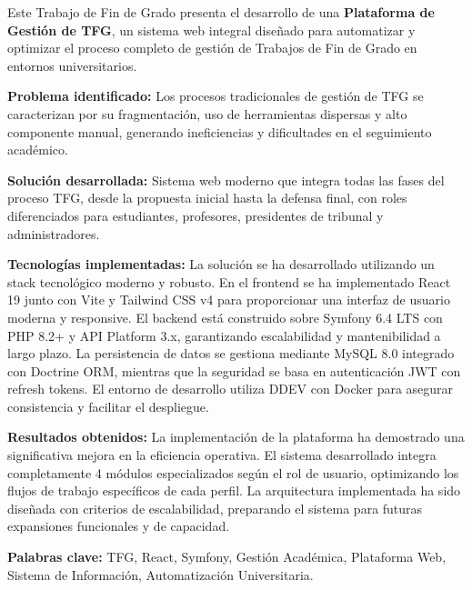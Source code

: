 Este Trabajo de Fin de Grado presenta el desarrollo de una \textbf{Plataforma 
de Gestión de TFG}, un sistema web integral diseñado para automatizar y 
optimizar el proceso completo de gestión de Trabajos de Fin de Grado en 
entornos universitarios.

\textbf{Problema identificado:} Los procesos tradicionales de gestión de TFG 
se caracterizan por su fragmentación, uso de herramientas dispersas y 
alto componente manual, generando ineficiencias y dificultades en el 
seguimiento académico.

\textbf{Solución desarrollada:} Sistema web moderno que integra todas las 
fases del proceso TFG, desde la propuesta inicial hasta la defensa final, 
con roles diferenciados para estudiantes, profesores, presidentes de 
tribunal y administradores.

\textbf{Tecnologías implementadas:} La solución se ha desarrollado utilizando un stack tecnológico moderno y robusto. En el frontend se ha implementado React 19 junto con Vite y Tailwind CSS v4 para proporcionar una interfaz de usuario moderna y responsive. El backend está construido sobre Symfony 6.4 LTS con PHP 8.2+ y API Platform 3.x, garantizando escalabilidad y mantenibilidad a largo plazo. La persistencia de datos se gestiona mediante MySQL 8.0 integrado con Doctrine ORM, mientras que la seguridad se basa en autenticación JWT con refresh tokens. El entorno de desarrollo utiliza DDEV con Docker para asegurar consistencia y facilitar el despliegue.

\textbf{Resultados obtenidos:} La implementación de la plataforma ha demostrado una significativa mejora en la eficiencia operativa. El sistema desarrollado integra completamente 4 módulos especializados según el rol de usuario, optimizando los flujos de trabajo específicos de cada perfil. La arquitectura implementada ha sido diseñada con criterios de escalabilidad, preparando el sistema para futuras expansiones funcionales y de capacidad.

\textbf{Palabras clave:} TFG, React, Symfony, Gestión Académica, Plataforma Web, 
Sistema de Información, Automatización Universitaria.

\newpage
